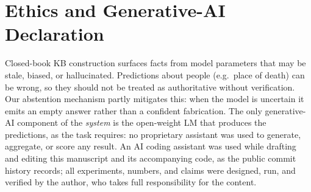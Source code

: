 \section*{Ethics and Generative-AI Declaration}
Closed-book KB construction surfaces facts from model parameters that may be
stale, biased, or hallucinated. Predictions about people (e.g.\ place of death)
can be wrong, so they should not be treated as authoritative without verification. Our abstention mechanism partly mitigates this: when the model is uncertain it
emits an empty answer rather than a confident fabrication. The only generative-AI component of the \emph{system} is the open-weight LM that
produces the predictions, as the task requires: no proprietary assistant was used
to generate, aggregate, or score any result. An AI coding assistant was used while
drafting and editing this manuscript and its accompanying code, as the public
commit history records; all experiments, numbers, and claims were designed, run,
and verified by the author, who takes full responsibility for the content.

